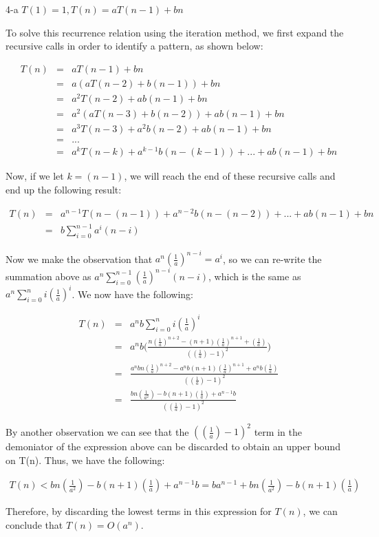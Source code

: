 \documentclass[11pt]{article}
\begin{document}
\begin{prob}{4-a}
$T(1) = 1, T(n) = aT(n-1) + bn$
\end{prob}
\begin{sol} 

To solve this recurrence relation using the iteration method, we first expand the recursive calls in order to identify a pattern, as shown below:

\begin{eqnarray*}
T(n) & = & aT(n-1) + bn \\
& = & a(aT(n-2) + b(n-1)) + bn \\
& = & a^2T(n-2) + ab(n-1) + bn\\
& = & a^2(aT(n-3) + b(n-2)) + ab(n-1) + bn\\
& = & a^3T(n-3) + a^2b(n-2) + ab(n-1) + bn \\
& = & ... \\
& = & a^kT(n-k) + a^{k-1}b(n-(k-1)) + ... + ab(n-1) + bn
\end{eqnarray*}

Now, if we let $k = (n-1)$, we will reach the end of these recursive calls and end up the following result:

\begin{eqnarray*}
T(n) & = & a^{n-1}T(n-(n-1)) + a^{n-2}b(n-(n-2)) + ... + ab(n-1) + bn \\
& = & b\sum_{i=0}^{n-1} a^i(n-i)
\end{eqnarray*}

Now we make the observation that $a^n(\frac{1}{a})^{n-i} = a^{i}$, so we can re-write the summation above as $a^{n}\sum_{i=0}^{n-1} (\frac{1}{a})^{n-i}(n-i)$, which is the same as $a^{n}\sum_{i=0}^{n} i(\frac{1}{a})^i$. We now have the following:

\begin{eqnarray*}
T(n) & = & a^{n}b\sum_{i=0}^{n} i(\frac{1}{a})^i \\
& = & a^{n}b\Bigg(\frac{n(\frac{1}{a})^{n+2} - (n+1)(\frac{1}{a})^{n+1} + (\frac{1}{a})}{((\frac{1}{a}) - 1)^2} \Bigg)\\
& = & \frac{a^{n}bn(\frac{1}{a})^{n+2} - a^{n}b(n+1)(\frac{1}{a})^{n+1} + a^{n}b(\frac{1}{a})}{((\frac{1}{a}) - 1)^2} \\
& = & \frac{bn(\frac{1}{a^2}) - b(n+1)(\frac{1}{a}) + a^{n - 1}b}{((\frac{1}{a}) - 1)^2} 
\end{eqnarray*}

By another observation we can see that the $((\frac{1}{a}) - 1)^2$ term in the demoniator of the expression above can be discarded to obtain an upper bound on T(n). Thus, we have the following:

\begin{eqnarray*}
T(n) < bn(\frac{1}{a^2}) - b(n+1)(\frac{1}{a}) + a^{n - 1}b = ba^{n-1} + bn(\frac{1}{a^2}) - b(n+1)(\frac{1}{a}) 
\end{eqnarray*}

Therefore, by discarding the lowest terms in this expression for $T(n)$, we can conclude that $T(n) = O(a^n)$.

\end{sol}
\end{document}
